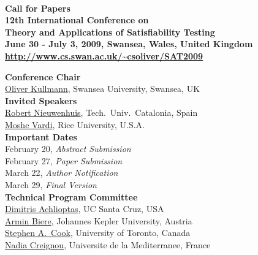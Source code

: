 \documentclass[10pt]{article}
\newcommand{\bthlight}[1]{{\color[rgb]{0.2,0.2,0.5}#1}}
\newcommand{\bhlight}[1]{{\color[rgb]{0.2,0.2,0.6}#1}}
\begin{document}
\pagestyle{empty}

\begin{center}
  {\bf
    \bthlight{{\huge SAT 2009}} \\[0.3cm]
    {\Large Call for Papers} \\[0.15cm]
    \bthlight{
      {\LARGE 12th International Conference on} \\[0.2cm]
      {\LARGE Theory and Applications of Satisfiability Testing} \\[0.15cm]
      {\Large June 30 - July 3, 2009, Swansea, Wales, United Kingdom}
    } \\[0.15cm]
    {\large \url{http://www.cs.swan.ac.uk/~csoliver/SAT2009}}
  }
\end{center}

\vspace*{-0.1cm}
%
\begin{minipage}[t]{7.5cm}
{\large {\bf \bhlight{Conference Chair}}} \\[0.05cm]
{\small
  \href{http://www.cs.swan.ac.uk/~csoliver/index.html}{Oliver Kullmann}, Swansea University, Swansea, UK\\[0.3cm]
}
{\large {\bf \bhlight{Invited Speakers}}} \\%
{\small
  \href{http://www.lsi.upc.edu/~roberto/}{Robert Nieuwenhuis}, Tech.~Univ.~Catalonia, Spain\\
  \href{http://www.cs.rice.edu/~vardi/}{Moshe Vardi}, Rice University, U.S.A.\\[0.3cm]
}
{\large {\bf \bhlight{Important Dates}}} \\[0.05cm]
{\small
  February 20, {\em Abstract Submission} \\
  February 27, {\em Paper Submission} \\
  March 22, {\em Author Notification} \\
  March 29, {\em Final Version} \\[0.3cm]
}
{\large {\bf \bhlight{Technical Program Committee}}} \\[0.01cm]
{\footnotesize
          \href{http://www.cs.ucsc.edu/~optas/}{Dimitris Achlioptas}, UC Santa Cruz, USA \\
          \href{http://fmv.jku.at/biere/}{Armin Biere}, Johannes Kepler University, Austria  \\
          \href{http://www.cs.toronto.edu/~sacook/}{Stephen A.\ Cook}, University of Toronto, Canada \\
          \href{http://www.dil.univ-mrs.fr/membres.html}{Nadia Creignou}, Universite de la Mediterranee, France  \\
}
\end{minipage}
\end{document}
